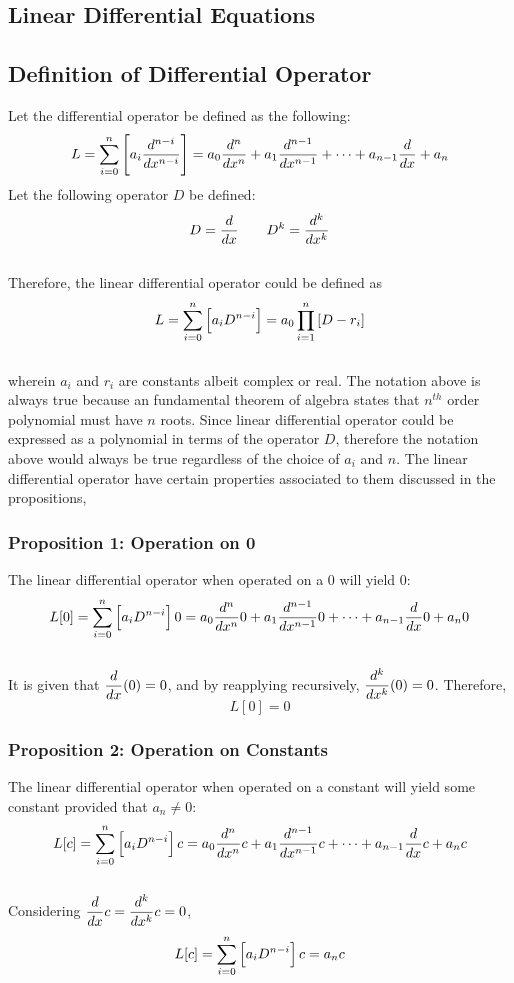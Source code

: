 \documentclass[a4paper, 12pt]{report}
\begin{document}
\begin{center}


\chapter{Linear Differential Equations}
\begin{comment}
\end{comment}
\section{Definition of Differential Operator}
\begin{comment}
\end{comment}
Let the differential operator be defined as the following: 
$$L = \sum_{i = 0}^{n}\left[a_i \frac{d^{n - i}}{dx^{n - i}}\right] = a_0 \frac{d^{n }}{dx^{n}} + a_1 \frac{d^{n - 1}}{dx^{n - 1}}+ \dots + a_{n - 1}\frac{d}{dx} + a_n$$
Let the following operator $D$ be defined:
$$D = \frac{d}{dx} \qquad D^k = \frac{d^k}{dx^k}$$
\\Therefore, the linear differential operator could be defined as 
$$L = \sum_{i = 0}^{n}\left[a_i D^{n - i}\right] = a_0\prod_{i = 1}^{n}\left[D - r_i\right]$$
\\wherein $a_i$ and $r_i$ are constants albeit complex or real. The notation above is always true because an fundamental theorem of algebra states that $n^{th}$ order polynomial must have $n$ roots. Since linear differential operator could be expressed as a polynomial in terms of the operator $D$, therefore the notation above would always be true regardless of the choice of $a_i$ and $n$. The linear differential operator have certain properties associated to them discussed in the propositions,
\subsection{Proposition 1: Operation on 0} 
\begin{comment}
\end{comment}
The linear differential operator when operated on a 0 will yield 0:
$$L[0]=\sum_{i = 0}^{n}\left[a_i D^{n - i}\right]0=a_0 \frac{d^{n }}{dx^{n}}0 + a_1 \frac{d^{n - 1}}{dx^{n - 1}}0+ \dots + a_{n - 1}\frac{d}{dx}0 + a_n0$$ 
\\It is given that $\displaystyle{\frac{d}{dx}(0) = 0}$, and by reapplying recursively, $\displaystyle{\frac{d^k}{dx^k}(0) = 0}$. Therefore, 
$$L[0]=0$$
\subsection{Proposition 2: Operation on Constants}
\begin{comment}
\end{comment}
The linear differential operator when operated on a constant will yield some constant provided that $a_n \neq 0$:
$$L[c] = \sum_{i = 0}^{n}\left[a_i D^{n - i}\right]c = a_0 \frac{d^{n }}{dx^{n}}c + a_1 \frac{d^{n - 1}}{dx^{n - 1}}c+ \dots + a_{n - 1}\frac{d}{dx}c + a_nc$$
\\Considering $\displaystyle{\frac{d}{dx}c = \frac{d^k}{dx^k}c = 0}$,
$$L[c] = \sum_{i = 0}^{n}\left[a_i D^{n - i}\right]c = a_nc$$

\end{center}
\end{document}
